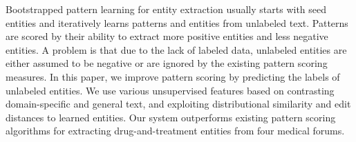 Bootstrapped pattern learning for entity extraction usually starts with seed entities and iteratively learns patterns and entities from unlabeled text. Patterns are scored by their ability to extract more positive entities and less negative entities. A problem is that due to the lack of labeled data, unlabeled entities are either assumed to be negative or are ignored by the existing pattern scoring measures. In this paper, we improve pattern scoring by predicting the labels of unlabeled entities. We  use various unsupervised features based on contrasting domain-specific and general text, and exploiting distributional similarity and edit distances to learned entities. Our system outperforms existing pattern scoring algorithms for extracting drug-and-treatment entities from four medical forums.
